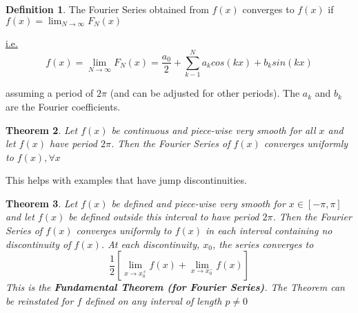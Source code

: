\documentclass[12pt]{article}
\theoremstyle{plain}
\newtheorem{theorem}{Theorem}[section]
\theoremstyle{definition}
\newtheorem{definition}[theorem]{Definition}
\begin{document}
\begin{definition}
	The Fourier Series obtained from $f(x)$ converges to $f(x)$ if $f(x) = \lim_{N\to\infty} F_N (x)$

	\underline{i.e.} $$f(x) = \lim_{N\to\infty} F_N (x) = \frac{a_0}{2}+ \sum^N_{k-1} a_k cos(kx) + b_k sin(kx)$$

	assuming a period of $2\pi$ (and can be adjusted for other periods). The $a_k$ and $b_k$ are the Fourier coefficients.
\end{definition}

\begin{theorem}
	Let $f(x)$ be continuous and piece-wise very smooth for all $x$ and let $f(x)$ have period $2\pi$. Then the Fourier Series of $f(x)$ converges uniformly to $f(x), \forall x$
\end{theorem}

This helps with examples that have jump discontinuities.

\begin{theorem}
	Let $f(x)$ be defined and piece-wise very smooth for $x\in[-\pi,\pi]$ and let $f(x)$ be defined outside this interval to have period $2\pi$. Then the Fourier Series of $f(x)$ converges uniformly to $f(x)$ in each interval containing no discontinuity of $f(x)$. At each discontinuity, $x_0$, the series converges to
	$$\frac{1}{2} [\lim_{x\to x_0^+} f(x) + \lim_{x\to x_0^-} f(x)]$$
	This is the \textbf{Fundamental Theorem (for Fourier Series)}. The Theorem can be reinstated for $f$ defined on any interval of length $p\neq 0$
\end{theorem}
\end{document}
